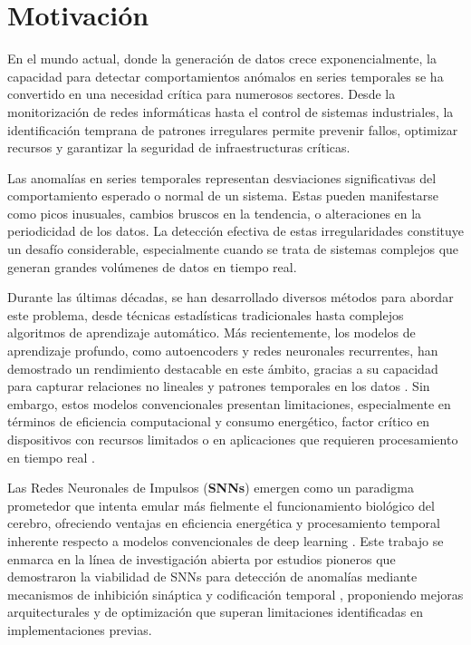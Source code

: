 \section{Motivación}

En el mundo actual, donde la generación de datos crece exponencialmente, la capacidad para detectar comportamientos anómalos en series temporales se ha convertido en una necesidad crítica para numerosos sectores. Desde la monitorización de redes informáticas hasta el control de sistemas industriales, la identificación temprana de patrones irregulares permite prevenir fallos, optimizar recursos y garantizar la seguridad de infraestructuras críticas.

Las anomalías en series temporales representan desviaciones significativas del comportamiento esperado o normal de un sistema. Estas pueden manifestarse como picos inusuales, cambios bruscos en la tendencia, o alteraciones en la periodicidad de los datos. La detección efectiva de estas irregularidades constituye un desafío considerable, especialmente cuando se trata de sistemas complejos que generan grandes volúmenes de datos en tiempo real. 

Durante las últimas décadas, se han desarrollado diversos métodos para abordar este problema, desde técnicas estadísticas tradicionales hasta complejos algoritmos de aprendizaje automático. Más recientemente, los modelos de aprendizaje profundo, como autoencoders y redes neuronales recurrentes, han demostrado un rendimiento destacable en este ámbito, gracias a su capacidad para capturar relaciones no lineales y patrones temporales en los datos \cite{cherdo_time_2023,kshirasagar_auditory_2024}. Sin embargo, estos modelos convencionales presentan limitaciones, especialmente en términos de eficiencia computacional y consumo energético, factor crítico en dispositivos con recursos limitados o en aplicaciones que requieren procesamiento en tiempo real \cite{kshirasagar_auditory_2024,plummer_2d_2025}. 

Las Redes Neuronales de Impulsos (\textbf{SNNs}) emergen como un paradigma prometedor que intenta emular más fielmente el funcionamiento biológico del cerebro, ofreciendo ventajas en eficiencia energética y procesamiento temporal inherente respecto a modelos convencionales de deep learning \cite{lv_efficient_2024,yusob_anomaly_2018,basler_unsupervised_2022}. Este trabajo se enmarca en la línea de investigación abierta por estudios pioneros que demostraron la viabilidad de SNNs para detección de anomalías mediante mecanismos de inhibición sináptica y codificación temporal \cite{cherdo_time_2023,yusob_anomaly_2018,basler_unsupervised_2022}, proponiendo mejoras arquitecturales y de optimización que superan limitaciones identificadas en implementaciones previas. 

